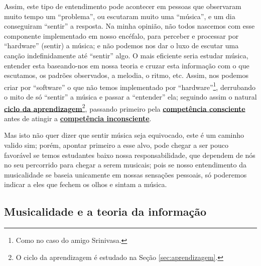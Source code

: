 Assim, este tipo de entendimento  pode acontecer em pessoas que observaram muito tempo um ``problema'', 
ou escutaram muito uma ``música'', 
e um dia conseguiram ``sentir'' a resposta. 
Na minha opinião, 
não todos nascemos com esse componente implementado em nosso encéfalo, para perceber e processar por ``hardware'' (sentir) a música; 
e não podemos nos dar o luxo de escutar uma canção indefinidamente até ``sentir'' algo. 
O mais eficiente seria estudar música, 
entender esta baseando-nos em nossa teoria e cruzar esta informação com o que escutamos,
os padrões observados, a melodia, o ritmo, etc. 
Assim, nos podemos criar por ``software'' o que não temos implementado por ``hardware''\footnote{Como no caso do amigo Srinivasa.}, 
derrubando o mito de só ``sentir'' a música e passar a ``entender'' ela;
seguindo assim o natural \hyperref[sec:aprendizagem]{\textbf{ciclo da aprendizagem}}\footnote{O
ciclo da aprendizagem é estudado na Seção \ref{sec:aprendizagem}.}, passando primeiro pela 
\hyperref[ref:CompetenciaConsciente]{\textbf{competência consciente}} 
antes de atingir a  \hyperref[ref:CompetenciaInconsciente]{\textbf{competência inconsciente}}.

Mas isto não quer dizer que sentir música seja equivocado, este é um caminho valido sim;
porém, apontar primeiro a esse alvo, 
pode chegar a ser pouco favorável se temos estudantes baixo nossa responsabilidade, 
que dependem de nós no seu percorrido para chegar a serem musicais; 
pois se nosso entendimento da musicalidade se baseia unicamente em nossas sensações pessoais,
só poderemos indicar a eles que fechem os olhos e sintam a música.


\subsection{Musicalidade e a teoria da informação}
\label{sec:musicalidadeinfmutua}


